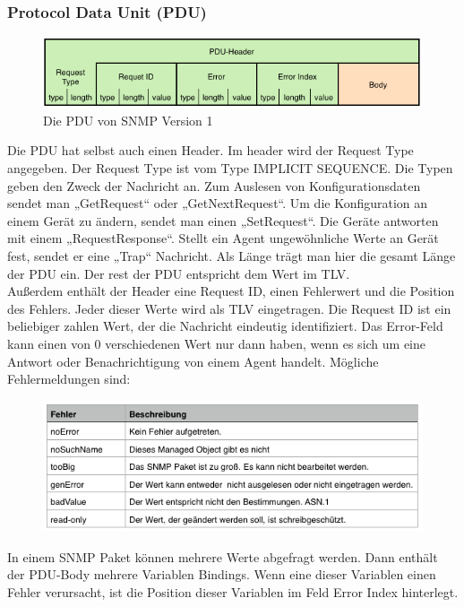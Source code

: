 \documentclass[11pt,a4paper]{article}
\begin{document}
\subsubsection{Protocol Data Unit (PDU)}
\begin{figure}[h]
	\centering
	\includegraphics[scale=.8]{Bilder/SNMPv1-PDU.png}
	\caption{Die PDU von SNMP Version 1}
\end{figure}
Die PDU hat selbst auch einen Header. Im header wird der Request Type angegeben. Der Request Type ist vom Type IMPLICIT SEQUENCE. Die Typen geben den Zweck der Nachricht an. Zum Auslesen von Konfigurationsdaten sendet man „GetRequest“ oder „GetNextRequest“. Um die Konfiguration an einem Gerät zu ändern, sendet man einen „SetRequest“. Die Geräte antworten mit einem „RequestResponse“. Stellt ein Agent ungewöhnliche Werte an Gerät fest, sendet er eine „Trap“ Nachricht. Als Länge trägt man hier die gesamt Länge der PDU ein. Der rest der PDU entspricht dem Wert im TLV.\\
Außerdem enthält der Header eine Request ID, einen Fehlerwert und die Position des Fehlers. Jeder dieser Werte wird als TLV eingetragen.
Die Request ID ist ein beliebiger zahlen Wert, der die Nachricht eindeutig identifiziert.
Das Error-Feld kann einen von 0 verschiedenen Wert nur dann haben, wenn es sich um eine Antwort oder Benachrichtigung von einem Agent handelt. Mögliche Fehlermeldungen sind:\\
\begin{figure}[h]
	\centering
	\includegraphics[scale=.75]{Bilder/SNMPv1-Fehler.png}
\end{figure}
In einem SNMP Paket können mehrere Werte abgefragt werden. Dann enthält der PDU-Body mehrere Variablen Bindings. Wenn eine dieser Variablen einen Fehler verursacht, ist die Position dieser Variablen im Feld Error Index hinterlegt.\\
\end{document}

